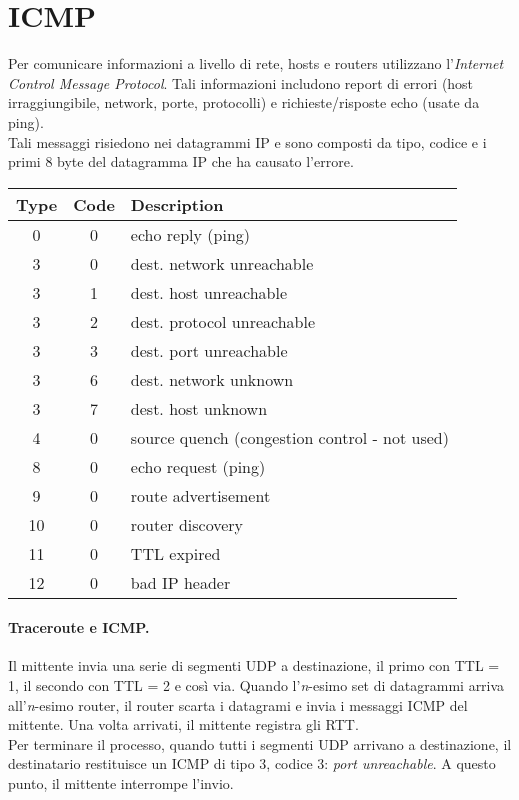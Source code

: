 \section{ICMP}
Per comunicare informazioni a livello di rete, hosts e routers utilizzano l'\textit{Internet Control Message Protocol}. Tali informazioni includono report di errori (host irraggiungibile, network, porte, protocolli) e richieste/risposte echo (usate da ping).\\
Tali messaggi risiedono nei datagrammi IP e sono composti da tipo, codice e i primi 8 byte del datagramma IP che ha causato l'errore.
\begin{center}
	\begin{tabular}{|c|c|p{5cm}|}
		\hline
		Type & Code & Description\\
		\hline
		0 & 0 & echo reply (ping)\\
		\hline
		3 & 0 & dest. network unreachable\\
		\hline
		3 & 1 & dest. host unreachable\\
		\hline
		3 & 2 & dest. protocol unreachable\\ 
		\hline
		3 & 3 & dest. port unreachable\\
		\hline
		3 & 6 & dest. network unknown\\
		\hline
		3 & 7 & dest. host unknown\\
		\hline
		4 & 0 & source quench (congestion control - not used)\\
		\hline
		8 & 0 & echo request (ping)\\
		\hline
		9 & 0 & route advertisement\\
		\hline
		10& 0 & router discovery\\
		\hline
		11& 0 & TTL expired\\
		\hline
		12& 0 & bad IP header\\
		\hline
	\end{tabular}
\end{center}

\paragraph{Traceroute e ICMP.}
Il mittente invia una serie di segmenti UDP a destinazione, il primo con TTL = 1, il secondo con TTL = 2 e così via.
Quando l'\textit{n}-esimo set di datagrammi arriva all'\textit{n}-esimo router, il router scarta i datagrami e invia i messaggi ICMP del mittente. Una volta arrivati, il mittente registra gli RTT.\\
Per terminare il processo, quando tutti i segmenti UDP arrivano a destinazione, il destinatario restituisce un ICMP di tipo 3, codice 3: \textit{port unreachable}. A questo punto, il mittente interrompe l'invio.
